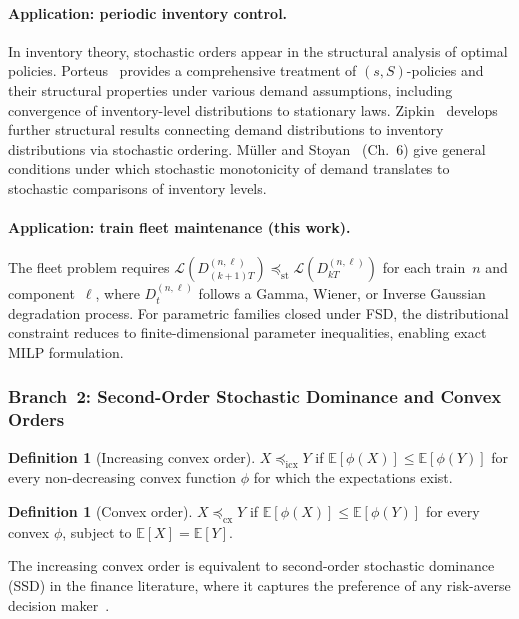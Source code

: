 \documentclass[11pt,a4paper]{article}
\theoremstyle{plain}
\theoremstyle{definition}
\newtheorem{definition}[theorem]{Definition}
\theoremstyle{remark}
\begin{document}
\paragraph{Application: periodic inventory control.}
In inventory theory, stochastic orders appear in the structural
analysis of optimal policies.  Porteus~\cite{porteus2002} provides
a comprehensive treatment of $(s,S)$-policies and their structural
properties under various demand assumptions, including convergence
of inventory-level distributions to stationary laws.
Zipkin~\cite{zipkin2000} develops further structural results
connecting demand distributions to inventory distributions via
stochastic ordering.  M\"{u}ller and Stoyan~\cite{muller2002} (Ch.~6)
give general conditions under which stochastic monotonicity of demand
translates to stochastic comparisons of inventory levels.

\paragraph{Application: train fleet maintenance (this work).}
The fleet problem requires
$\mathcal{L}(D_{(k+1)T}^{(n,\ell)}) \preceq_{\mathrm{st}}
\mathcal{L}(D_{kT}^{(n,\ell)})$ for each train~$n$ and
component~$\ell$, where $D_t^{(n,\ell)}$ follows a Gamma, Wiener, or
Inverse Gaussian degradation process.  For parametric families closed
under FSD, the distributional constraint reduces to finite-dimensional
parameter inequalities, enabling exact MILP formulation.

\subsubsection{Branch~2: Second-Order Stochastic Dominance and Convex Orders}
\label{sec:macro:ssd}

\begin{definition}[Increasing convex order]
\label{def:icx}
$X \preceq_{\mathrm{icx}} Y$ if $\mathbb{E}[\phi(X)] \le
\mathbb{E}[\phi(Y)]$ for every non-decreasing convex function $\phi$
for which the expectations exist.
\end{definition}

\begin{definition}[Convex order]
\label{def:cx}
$X \preceq_{\mathrm{cx}} Y$ if $\mathbb{E}[\phi(X)] \le
\mathbb{E}[\phi(Y)]$ for every convex $\phi$, subject to
$\mathbb{E}[X] = \mathbb{E}[Y]$.
\end{definition}

The increasing convex order is equivalent to second-order stochastic
dominance (SSD) in the finance literature, where it captures the
preference of any risk-averse decision maker~\cite{shaked2007,muller2002}.
\end{document}
